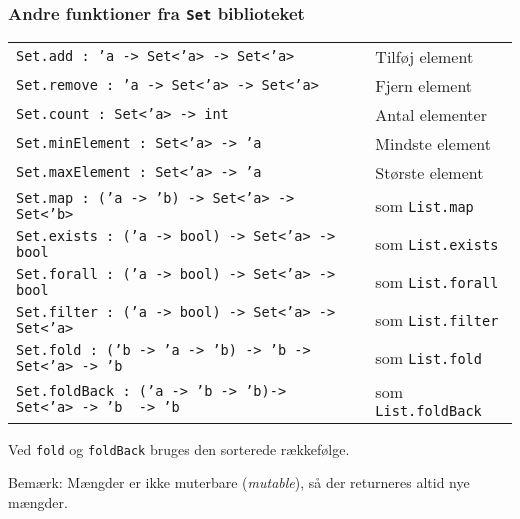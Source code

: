 \documentclass{beamer}
\begin{document}
\begin{frame}
\frametitle{Andre funktioner fra \texttt{Set} biblioteket}

{\small%
\begin{tabular}{@{\!\!\!\!\!\!\!\!\!\!\!\!}l@{\quad}l}
\texttt{Set.add\,:\,'a\,->\,Set<'a>\,->\,Set<'a>} & Tilføj element\\
\texttt{Set.remove\,:\,'a\,->\,Set<'a>\,->\,Set<'a>} & Fjern element\\
\texttt{Set.count\,: Set<'a>\,->\,int} & Antal elementer\\
\texttt{Set.minElement\,: Set<'a>\,->\,'a} & Mindste element\\
\texttt{Set.maxElement\,: Set<'a>\,->\,'a} & Største element\\
\texttt{Set.map\,:\,('a\,->\,'b)\,->\,Set<'a>\,->\,Set<'b>} & som \texttt{List.map}\\
\texttt{Set.exists\,:\,('a\,->\,bool)\,->\,Set<'a>\,->\,bool} & som \texttt{List.exists}\\
\texttt{Set.forall\,:\,('a\,->\,bool)\,->\,Set<'a>\,->\,bool} & som \texttt{List.forall}\\
\texttt{Set.filter\,:\,('a\,->\,bool)\,->\,Set<'a>\,->\,Set<'a>} & som \texttt{List.filter}\\
\texttt{Set.fold\,:\,('b\,->\,'a\,->\,'b)\,->\,'b\,->\,Set<'a>\,->\,'b} & som \texttt{List.fold}\\
\texttt{Set.foldBack\,:\,('a\,->\,'b\,->\,'b)->\,Set<'a>\,->\,'b\,\,->\,'b} & som \texttt{List.foldBack}\\
\end{tabular}
}

\vspace{2ex}
Ved \texttt{fold} og \texttt{foldBack} bruges den sorterede rækkefølge.

\vspace{1ex}
Bemærk: Mængder er ikke muterbare (\emph{mutable}), så der returneres
altid nye mængder.

\end{frame}
\end{document}
